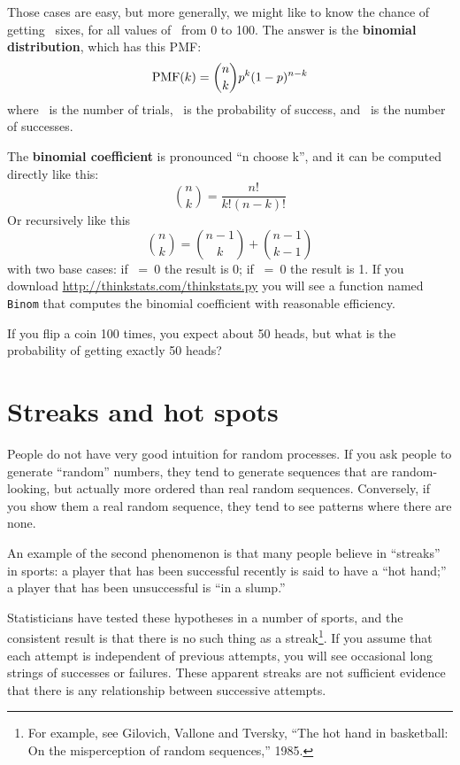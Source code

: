 \documentclass[12pt]{book}
\begin{document}
Those cases are easy, but more generally, we might like to know the
chance of getting \kk~sixes, for all values of \kk~from 0 to 100.  The
answer is the {\bf binomial distribution}, which has this PMF:
%
\[ \mathrm{PMF}(k) = \binom{n}{k} p^k (1-p)^{n-k}\]
%
where \n~is the number of trials, \p~is the probability of success,
and \kk~is the number of successes.

The {\bf binomial coefficient} is pronounced ``n choose k'', and it
can be computed directly like this:
%
\[ \binom{n}{k} = \frac{n!}{k!(n-k)!}  \]
%
Or recursively like this
%
\[ \binom{n}{k} = \binom{n-1}{k} + \binom{n-1}{k-1} \]
%
with two base cases: if \n~=~0 the result is 0; if \kk~=~0 the result is 1.
If you download \url{http://thinkstats.com/thinkstats.py} you will see a function
named {\tt Binom} that computes the binomial coefficient with reasonable
efficiency.

\begin{exercise}
If you flip a coin 100 times, you expect about 50 heads, but what
is the probability of getting exactly 50 heads?


\end{exercise}


\section{Streaks and hot spots}

People do not have very good intuition for random processes.  If you
ask people to generate ``random'' numbers, they tend to generate
sequences that are random-looking, but actually more ordered than real
random sequences.  Conversely, if you show them a real random
sequence, they tend to see patterns where there are none.

An example of the second phenomenon is that many people believe
in ``streaks'' in sports: a player that has been successful recently
is said to have a ``hot hand;'' a player that has been unsuccessful is
``in a slump.''

Statisticians have tested these hypotheses in a number of sports, and
the consistent result is that there is no such thing as a
streak\footnote{For example, see Gilovich, Vallone and Tversky, ``The
  hot hand in basketball: On the misperception of random sequences,''
  1985.}.  If you assume that each attempt is independent of previous
attempts, you will see occasional long strings of successes or
failures.  These apparent streaks are not sufficient evidence that
there is any relationship between successive attempts.
\end{document}
